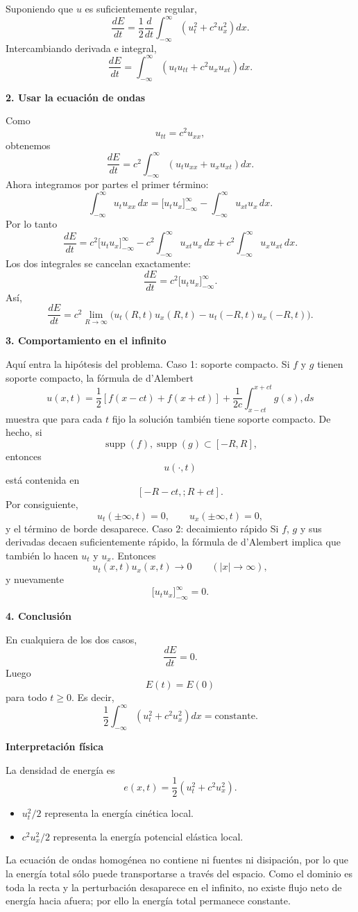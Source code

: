 \documentclass[11pt,spanish]{article}
\newcounter{problema}
\begin{document}
Suponiendo que $u$ es suficientemente regular,
$$
\frac{dE}{dt}
=
\frac12
\frac{d}{dt}
\int_{-\infty}^{\infty}
\left(
u_t^2+c^2u_x^2
\right)dx.
$$
Intercambiando derivada e integral,
$$
\frac{dE}{dt}
=
\int_{-\infty}^{\infty}
\left(
u_tu_{tt}
+
c^2u_xu_{xt}
\right)dx.
$$

{\bf 2. Usar la ecuación de ondas}

Como
$$
u_{tt}=c^2u_{xx},
$$
obtenemos
$$
\frac{dE}{dt}
=
c^2
\int_{-\infty}^{\infty}
\left(
u_tu_{xx}
+
u_xu_{xt}
\right)dx.
$$
Ahora integramos por partes el primer término:
$$
\int_{-\infty}^{\infty}
u_tu_{xx}\,dx
=
\Big[u_tu_x\Big]_{-\infty}^{\infty}
-
\int_{-\infty}^{\infty}
u_{xt}u_x\,dx.
$$
Por lo tanto
$$
\frac{dE}{dt}
=
c^2
\Big[u_tu_x\Big]_{-\infty}^{\infty}
-
c^2
\int_{-\infty}^{\infty}
u_{xt}u_x\,dx
+
c^2
\int_{-\infty}^{\infty}
u_xu_{xt}\,dx.
$$
Los dos integrales se cancelan exactamente:
$$
\frac{dE}{dt}
=
c^2
\Big[u_tu_x\Big]_{-\infty}^{\infty}.
$$
Así,
$$
\boxed{
\frac{dE}{dt}
=
c^2
\lim_{R\to\infty}
\Big(
u_t(R,t)u_x(R,t)
-
u_t(-R,t)u_x(-R,t)
\Big).
}
$$

{\bf 3. Comportamiento en el infinito}

Aquí entra la hipótesis del problema.
Caso 1: soporte compacto.
Si $f$ y $g$ tienen soporte compacto, la fórmula de d'Alembert
$$
u(x,t)
=
\frac12[f(x-ct)+f(x+ct)]
+
\frac1{2c}
\int_{x-ct}^{x+ct}
g(s),ds
$$
muestra que para cada $t$ fijo la solución también tiene soporte compacto.
De hecho, si
$$
\operatorname{supp}(f),\operatorname{supp}(g)
\subset[-R,R],
$$
entonces
$$
u(\cdot,t)
$$
está contenida en
$$
[-R-ct,;R+ct].
$$
Por consiguiente,
$$
u_t(\pm\infty,t)=0,
\qquad
u_x(\pm\infty,t)=0,
$$
y el término de borde desaparece.
Caso 2: decaimiento rápido
Si $f$, $g$ y sus derivadas decaen suficientemente rápido, la fórmula de d'Alembert implica que también lo hacen $u_t$ y $u_x$.
Entonces
$$
u_t(x,t)u_x(x,t)\to 0
\qquad (|x|\to\infty),
$$
y nuevamente
$$
\Big[u_tu_x\Big]_{-\infty}^{\infty}=0.
$$

{\bf 4. Conclusión}

En cualquiera de los dos casos,
$$
\frac{dE}{dt}=0.
$$
Luego
$$
\boxed{
E(t)=E(0)
}
$$
para todo $t\ge0$.
Es decir,
$$
\boxed{
\frac12\int_{-\infty}^{\infty}
\left(
u_t^2+c^2u_x^2
\right)dx
=
\text{constante}.
}
$$

{\bf Interpretación física}

La densidad de energía es
$$
e(x,t)
=
\frac12\left(u_t^2+c^2u_x^2\right).
$$
\begin{itemize}
\item $u_t^2/2$ representa la energía cinética local.
\item $c^2u_x^2/2$ representa la energía potencial elástica local.
\end{itemize}
La ecuación de ondas homogénea no contiene ni fuentes ni disipación, por lo que la energía total sólo puede transportarse a través del espacio. Como el dominio es toda la recta y la perturbación desaparece en el infinito, no existe flujo neto de energía hacia afuera; por ello la energía total permanece constante.
\end{document}
